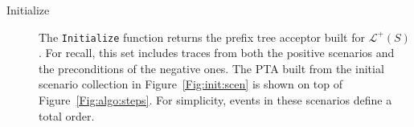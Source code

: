 \begin{description}

\item[Initialize] The \texttt{Initialize} function returns the prefix tree acceptor built for $\mathcal{L}^+(S)$. For recall, this set includes traces from both the positive scenarios and the preconditions of the negative ones. The PTA built from the initial scenario collection in Figure~\ref{Fig:init:scen} is shown on top of Figure~\ref{Fig:algo:steps}. For simplicity, events in these scenarios define a total order. 

\begin{figure}
\centering
{}

\end{figure}
\end{description}

